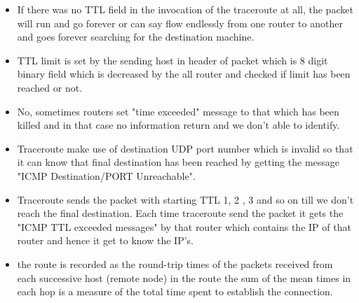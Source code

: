 \documentclass[14pt]{extarticle}
\begin{document}
    \begin{itemize}
        \item If there was no TTL field in the invocation of the traceroute at all, the packet will run and go forever or can say flow endlessly from one router to another and goes forever searching for the destination machine. 
        \item TTL limit is set by the sending host in header of packet which is 8 digit binary field which is decreased by the all router and checked if limit has been reached or not. 
        \item No, sometimes routers set "time exceeded" message to that which has been killed and in that case no information return and we don't able to identify.
        \item Traceroute make use of destination UDP port number which is invalid so that it can know that final destination has been reached by getting the message "ICMP Destination/PORT Unreachable". 
        \item Traceroute sends the packet with starting TTL 1, 2 , 3 and so on till we don't reach the final destination. Each time traceroute send the packet it gets the "ICMP TTL exceeded messages" by that router which contains the IP of that router and hence it get to know the IP's.
        \item the route is recorded as the round-trip times of the packets received from each successive host (remote node) in the route  the sum of the mean times in each hop is a measure of the total time spent to establish the connection.
    \end{itemize}
    \vspace{1cm}
\end{document}
